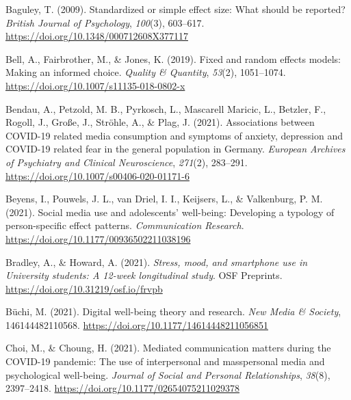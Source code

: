\documentclass[
  man,mask]{apa7}
\newlength{\cslhangindent}
\newlength{\cslentryspacingunit} %
\newenvironment{CSLReferences}[2] %
 {%
  \setlength{\parindent}{0pt}
  \ifodd #1
  \let\oldpar\par
  \def\par{\hangindent=\cslhangindent\oldpar}
  \fi
  \setlength{\parskip}{#2\cslentryspacingunit}
 }%
 {}
\begin{document}
\hypertarget{refs}{}
\begin{CSLReferences}{1}{0}
\leavevmode{}%
Baguley, T. (2009). Standardized or simple effect size: {What} should be reported? \emph{British Journal of Psychology}, \emph{100}(3), 603--617. \url{https://doi.org/10.1348/000712608X377117}

\leavevmode{}%
Bell, A., Fairbrother, M., \& Jones, K. (2019). Fixed and random effects models: Making an informed choice. \emph{Quality \& Quantity}, \emph{53}(2), 1051--1074. \url{https://doi.org/10.1007/s11135-018-0802-x}

\leavevmode{}%
Bendau, A., Petzold, M. B., Pyrkosch, L., Mascarell Maricic, L., Betzler, F., Rogoll, J., Große, J., Ströhle, A., \& Plag, J. (2021). Associations between {COVID-19} related media consumption and symptoms of anxiety, depression and {COVID-19} related fear in the general population in {Germany}. \emph{European Archives of Psychiatry and Clinical Neuroscience}, \emph{271}(2), 283--291. \url{https://doi.org/10.1007/s00406-020-01171-6}

\leavevmode{}%
Beyens, I., Pouwels, J. L., van Driel, I. I., Keijsers, L., \& Valkenburg, P. M. (2021). Social media use and adolescents' well-being: {Developing} a typology of person-specific effect patterns. \emph{Communication Research}. \url{https://doi.org/10.1177/00936502211038196}

\leavevmode{}%
Bradley, A., \& Howard, A. (2021). \emph{Stress, mood, and smartphone use in {University} students: {A} 12-week longitudinal study}. {OSF Preprints}. \url{https://doi.org/10.31219/osf.io/frvpb}

\leavevmode{}%
Büchi, M. (2021). Digital well-being theory and research. \emph{New Media \& Society}, 146144482110568. \url{https://doi.org/10.1177/14614448211056851}

\leavevmode{}%
Choi, M., \& Choung, H. (2021). Mediated communication matters during the {COVID-19} pandemic: {The} use of interpersonal and masspersonal media and psychological well-being. \emph{Journal of Social and Personal Relationships}, \emph{38}(8), 2397--2418. \url{https://doi.org/10.1177/02654075211029378}


\end{CSLReferences}
\end{document}
